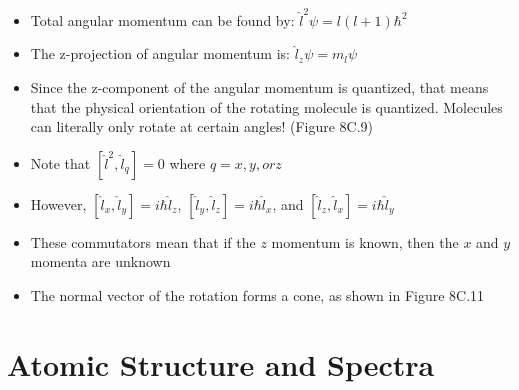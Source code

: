 \documentclass[12pt, openany, letterpaper]{memoir}
\begin{document}
\begin{itemize}
\begin{itemize}
		\item Total angular momentum can be found by: $\hat{l}^2\psi=l(l+1)\hbar^2$
		\item The z-projection of angular momentum is: $\hat{l}_z\psi=m_l\psi$
		\item Since the z-component of the angular momentum is quantized, that means that the physical orientation of the rotating molecule is quantized. Molecules can literally only rotate at certain angles! (Figure 8C.9)
		\item Note that $\left[\hat{l}^2,\hat{l}_q\right]=0$ where $q=x,y, or z$
		\item However, $\left[\hat{l}_x,\hat{l}_y\right]=i\hbar\hat{l}_z$, $\left[\hat{l}_y,\hat{l}_z\right]=i\hbar\hat{l}_x$, and $\left[\hat{l}_z,\hat{l}_x\right]=i\hbar\hat{l}_y$
		\item These commutators mean that if the $z$ momentum is known, then the $x$ and $y$ momenta are unknown
		\item The normal vector of the rotation forms a cone, as shown in Figure 8C.11
	\end{itemize}
\end{itemize}

\chapter{Atomic Structure and Spectra}
\end{document}
